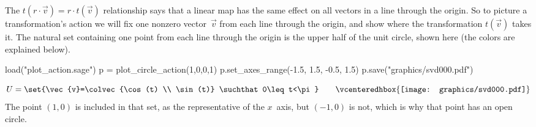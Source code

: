The $t(r\cdot\vec{v})=r\cdot t(\vec{v})$ relationship says that
a linear map has the same effect on all vectors in a line through the
origin.
So to picture a transformation's action we will fix 
one nonzero vector~$\vec{v}$ from each line through the origin,
and show where the transformation $t(\vec{v})$ takes it.
The natural set containing one point from each line through the origin 
is the upper half of the unit circle, shown here
(the colors are explained below).
\begin{sagesilent}
load("plot_action.sage")
p = plot_circle_action(1,0,0,1) 
p.set_axes_range(-1.5, 1.5, -0.5, 1.5) 
p.save("graphics/svd000.pdf")
\end{sagesilent}
\begin{equation*}
  U=\set{\vec{v}=\colvec{\cos(t) \\ \sin(t)}
         \suchthat 
         0\leq t<\pi}
  \qquad
  \vcenteredhbox{\texttt{[image: graphics/svd000.pdf]}}  
\end{equation*}
The point $(1,0)$ is included in that set, as the representative of
the $x$~axis, but
$(-1,0)$ is not, which is why that point has an open circle.

